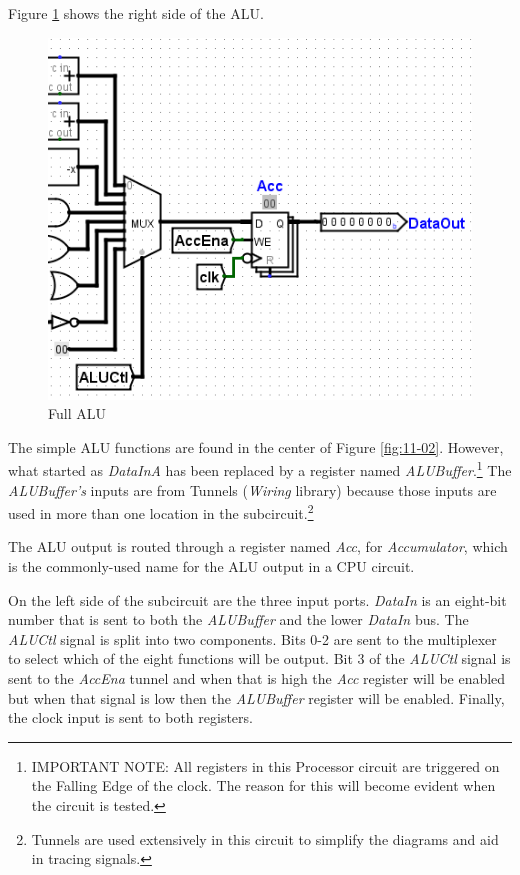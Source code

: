 Figure \ref{fig:11-03} shows the right side of the ALU.

\begin{figure}[H]
	\centering
	\includegraphics[width=\maxwidth{.95\linewidth}]{gfx/11-03}
	\caption{Full ALU}
	\label{fig:11-03}
\end{figure}

The simple \ac{ALU} functions are found in the center of Figure \ref{fig:11-02}. However, what started as \textit{DataInA} has been replaced by a register named \textit{ALUBuffer}.\footnote{IMPORTANT NOTE: All registers in this Processor circuit are triggered on the Falling Edge of the clock. The reason for this will become evident when the circuit is tested.} The \textit{ALUBuffer's} inputs are from Tunnels (\textit{Wiring} library) because those inputs are used in more than one location in the subcircuit.\footnote{Tunnels are used extensively in this circuit to simplify the diagrams and aid in tracing signals.}

The \ac{ALU} output is routed through a register named \textit{Acc}, for \textit{Accumulator}, which is the commonly-used name for the \ac{ALU} output in a \ac{CPU} circuit.

On the left side of the subcircuit are the three input ports. \textit{DataIn} is an eight-bit number that is sent to both the \textit{ALUBuffer} and the lower \textit{DataIn} bus. The \textit{ALUCtl} signal is split into two components. Bits 0-2 are sent to the multiplexer to select which of the eight functions will be output. Bit 3 of the \textit{ALUCtl} signal is sent to the \textit{AccEna} tunnel and when that is high the \textit{Acc} register will be enabled but when that signal is low then the \textit{ALUBuffer} register will be enabled. Finally, the clock input is sent to both registers.

